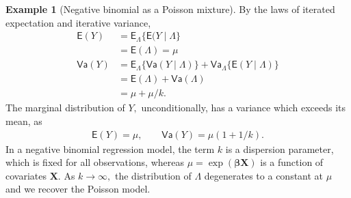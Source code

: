 \documentclass[
  11pt,
  letterpaper,
]{scrbook}
\theoremstyle{definition}
\newtheorem{example}{Example}[chapter]
\theoremstyle{plain}
\theoremstyle{plain}
\theoremstyle{plain}
\theoremstyle{definition}
\theoremstyle{definition}
\theoremstyle{plain}
\theoremstyle{plain}
\theoremstyle{remark}
\begin{document}
\begin{example}[Negative binomial as a Poisson
mixture]
By the laws of iterated expectation and iterative variance,
\begin{align*}
\mathsf{E}(Y) &= \mathsf{E}_{\Lambda}\{\mathsf{E}(Y \mid \Lambda\} \\& = \mathsf{E}(\Lambda) = \mu\\
\mathsf{Va}(Y) &= \mathsf{E}_{\Lambda}\{\mathsf{Va}(Y \mid \Lambda)\} + \mathsf{Va}_{\Lambda}\{\mathsf{E}(Y \mid \Lambda)\} \\&= \mathsf{E}(\Lambda) + \mathsf{Va}(\Lambda) \\&= \mu + \mu/k.
\end{align*} The marginal distribution of \(Y,\) unconditionally, has a
variance which exceeds its mean, as \begin{align*}
\mathsf{E}(Y) = \mu, \qquad \mathsf{Va}(Y) = \mu (1+1/k).
\end{align*} In a negative binomial regression model, the term \(k\) is
a dispersion parameter, which is fixed for all observations, whereas
\(\mu = \exp(\boldsymbol{\beta}\mathbf{X})\) is a function of covariates
\(\mathbf{X}.\) As \(k \to \infty,\) the distribution of \(\Lambda\)
degenerates to a constant at \(\mu\) and we recover the Poisson model.

\end{example}
\end{document}
